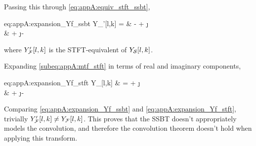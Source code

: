 Passing this through \cref{eq:appA:equiv_stft_ssbt},
\begin{equations}{eq:appA:expansion_Yf_ssbt}
	Y_{\F}'[l,k] =
	& - \xfr[l,k] \hfr[l,k] + \j \xfr[l,k] \hfr[l,k] \\
	& + \j \xfi[l,k] \hfr[l,k] - \xfi[l,k] \hfi[l,k]
\end{equations}
where $Y_{\F}'[l,k]$ is the STFT-equivalent of $Y_{\S}[l,k]$.

Expanding \cref{subeq:appA:mtf_stft} in terms of real and imaginary components,
\begin{equations}{eq:appA:expansion_Yf_stft}
	Y_{\F}[l,k] 
	& = \xfr[l,k] \hfr[l,k] + \j \xfr[l,k] \hfi[l,k] \\
	& + \j \xfi[l,k] \hfr[l,k] - \xfi[l,k] \hfi[l,k]
\end{equations}

Comparing \cref{eq:appA:expansion_Yf_ssbt} and \cref{eq:appA:expansion_Yf_stft}, trivially $Y_{\F}'[l,k] \neq Y_{\F}[l,k]$. This proves that the SSBT doesn't appropriately models the convolution, and therefore the convolution theorem doesn't hold when applying this transform.